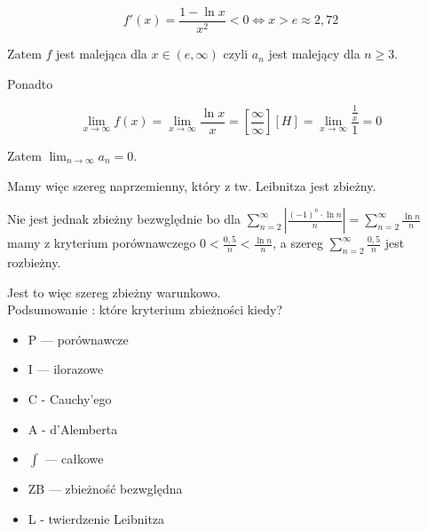 $$ f'(x) = \frac{1 - \ln x}{x^2} < 0 \Leftrightarrow x > e \approx 2,72 $$

Zatem $f$ jest malejąca dla $ x \in (e, \infty) $ czyli $a_n$ jest malejący dla $n \geq 3$.

Ponadto

$$ \lim_{x \to \infty} f(x) = \lim_{x \to \infty} \frac{\ln x}{x} = \left[ \frac{\infty}{\infty} \right][H]
= \lim_{x \to \infty} \frac{\frac{1}{x}}{1} = 0 $$

Zatem $ \lim_{n \to \infty} a_n = 0 $.

Mamy więc szereg naprzemienny, który z tw. Leibnitza jest zbieżny.

Nie jest jednak zbieżny bezwględnie bo dla $ \sum\limits_{n=2}^{\infty} \left| \frac{(-1)^n \cdot \ln n}{n} \right|
= \sum\limits_{n=2}^{\infty} \frac{\ln n}{n} $ mamy z kryterium porównawczego $0 < \frac{0,5}{n} < \frac{\ln n}{n}$,
a szereg $ \sum\limits_{n=2}^{\infty} \frac{0,5}{n} $ jest rozbieżny.

Jest to więc szereg zbieżny warunkowo. \\

Podsumowanie : które kryterium zbieżności kiedy?

\begin{itemize}
    \item P --- porównawcze
    \item I --- ilorazowe
    \item C - Cauchy'ego
    \item A - d'Alemberta
    \item $\int$ --- całkowe
    \item ZB --- zbieżność bezwględna
    \item L - twierdzenie Leibnitza \\
\end{itemize}

